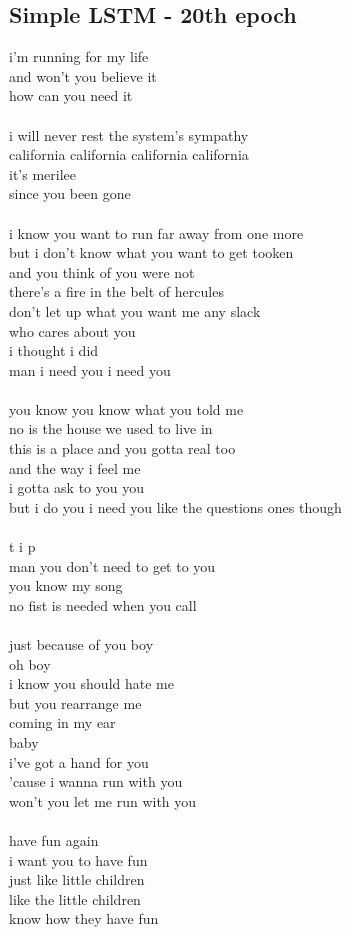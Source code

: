 \documentclass[conference]{IEEEtran}
\begin{document}
\subsection{Simple LSTM - 20th epoch}\label{LSTM20}
i'm running for my life \\
and won't you believe it \\
how can you need it \\
\\
i will never rest the system's sympathy \\
california california california california \\
it's merilee \\
since you been gone \\
\\
i know you want to run far away from one more \\
but i don't know what you want to get tooken \\
and you think of you were not \\
there's a fire in the belt of hercules \\
don't let up what you want me any slack \\
who cares about you \\
i thought i did \\
man i need you i need you \\
\\
you know you know what you told me \\
no is the house we used to live in \\
this is a place and you gotta real too \\
and the way i feel me \\
i gotta ask to you you \\
but i do you i need you like the questions ones though \\
\\
t i p \\
man you don't need to get to you \\
you know my song \\
no fist is needed when you call \\
\\
just because of you boy \\
oh boy \\
i know you should hate me \\
but you rearrange me \\
coming in my ear \\
baby \\
i've got a hand for you \\
'cause i wanna run with you \\
won't you let me run with you \\
\\
have fun again \\
i want you to have fun \\
just like little children \\
like the little children \\
know how they have fun \\
\end{document}
